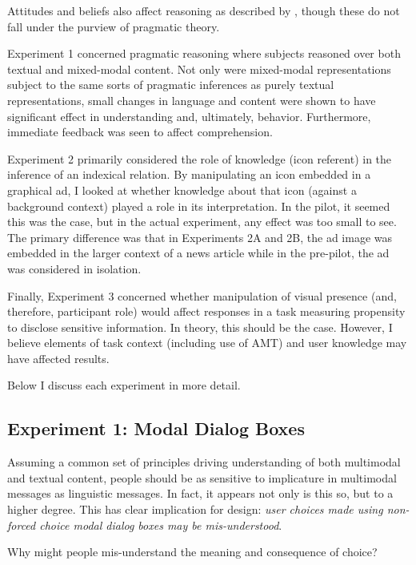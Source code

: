 Attitudes and beliefs also affect reasoning as described by  \citet{Kahneman:1984td},  though these do not fall under the purview of pragmatic theory.

Experiment 1 concerned pragmatic reasoning where subjects reasoned over both textual and mixed-modal content. Not only were mixed-modal representations subject to the same sorts of pragmatic inferences as purely textual representations, small changes in language and content were shown to have significant effect in understanding and, ultimately, behavior. Furthermore, immediate feedback was seen to affect comprehension. 

Experiment 2 primarily considered the role of knowledge (icon referent) in the inference of an indexical relation. By manipulating an icon embedded in a graphical ad, I looked at whether knowledge about that icon (against a background context) played a role in its interpretation. In the pilot, it seemed this was the case, but in the actual experiment, any effect was too small to see. The primary difference was that in Experiments 2A and 2B, the ad image was embedded in the larger context of a news article while in the pre-pilot, the ad was considered in isolation.

Finally, Experiment 3 concerned whether manipulation of visual presence (and, therefore, participant role) would affect responses in a task measuring propensity to disclose sensitive information. In theory, this should be the case. However, I believe elements of task context (including use of AMT) and user knowledge may have affected results.

Below I discuss each experiment in more detail.

\subsection{Experiment 1: Modal Dialog Boxes}
\label{experiment1:modaldialogboxes}

Assuming a common set of principles driving understanding of both multimodal and textual content, people should be as sensitive to implicature in multimodal messages as linguistic messages. In fact, it appears not only is this so, but to a higher degree. This has clear implication for design: \emph{user choices made using non-forced choice modal dialog boxes may be mis-understood}.

Why might people mis-understand the meaning and consequence of choice?

